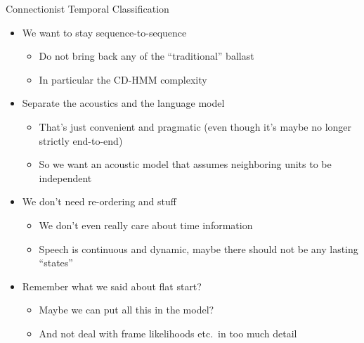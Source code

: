 \begin{frame}{Connectionist Temporal Classification}
  \begin{itemize}
  \item We want to stay sequence-to-sequence
    \begin{itemize}
    \item Do not bring back any of the ``traditional'' ballast
    \item In particular the CD-HMM complexity
    \end{itemize}
  \item Separate the acoustics and the language model
    \begin{itemize}
      \item That's just convenient and pragmatic (even though it's maybe no longer strictly end-to-end)
      \item So we want an acoustic model that assumes neighboring units to be independent
    \end{itemize}
  \item We don't need re-ordering and stuff
    \begin{itemize}
    \item We don't even really care about time information
    \item Speech is continuous and dynamic, maybe there should not be any lasting ``states''
    \end{itemize}
  \item Remember what we said about flat start?
    \begin{itemize}
    \item Maybe we can put all this in the model?
    \item And not deal with frame likelihoods etc.\ in too much detail
    \end{itemize}
  \end{itemize}
\end{frame}

